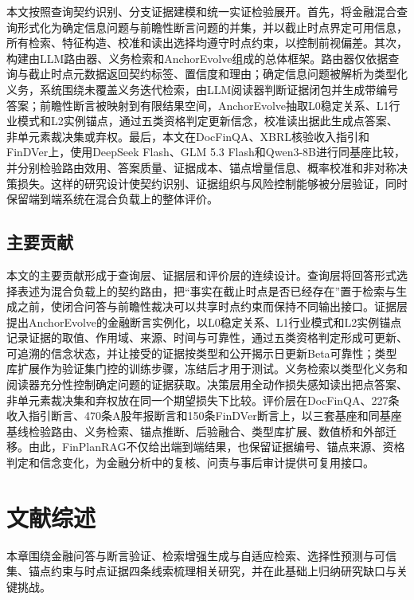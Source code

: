 本文按照查询契约识别、分支证据建模和统一实证检验展开。首先，将金融混合查询形式化为确定信息问题与前瞻性断言问题的并集，并以截止时点界定可用信息，所有检索、特征构造、校准和读出选择均遵守时点约束，以控制前视偏差\citep{lopezdeprado2018advances}。其次，构建由LLM路由器、义务检索和AnchorEvolve组成的总体框架。路由器仅依据查询与截止时点元数据返回契约标签、置信度和理由；确定信息问题被解析为类型化义务，系统围绕未覆盖义务迭代检索，由LLM阅读器判断证据闭包并生成带编号答案；前瞻性断言被映射到有限结果空间，AnchorEvolve抽取L0稳定关系、L1行业模式和L2实例锚点，通过五类资格判定更新信念，校准读出据此生成点答案、非单元素裁决集或弃权。最后，本文在DocFinQA、XBRL核验收入指引和FinDVer上，使用DeepSeek Flash、GLM 5.3 Flash和Qwen3-8B进行同基座比较，并分别检验路由效用、答案质量、证据成本、锚点增量信息、概率校准和非对称决策损失。这样的研究设计使契约识别、证据组织与风险控制能够被分层验证，同时保留端到端系统在混合负载上的整体评价。

\section{主要贡献}

本文的主要贡献形成于查询层、证据层和评价层的连续设计。查询层将回答形式选择表述为混合负载上的契约路由，把“事实在截止时点是否已经存在”置于检索与生成之前，使闭合问答与前瞻性裁决可以共享时点约束而保持不同输出接口。证据层提出AnchorEvolve的金融断言实例化，以L0稳定关系、L1行业模式和L2实例锚点记录证据的取值、作用域、来源、时间与可靠性，通过五类资格判定形成可更新、可追溯的信念状态，并让接受的证据按类型和公开揭示日更新Beta可靠性；类型库扩展作为验证集门控的训练步骤，冻结后才用于测试。义务检索以类型化义务和阅读器充分性控制确定问题的证据获取。决策层用全动作损失感知读出把点答案、非单元素裁决集和弃权放在同一个期望损失下比较。评价层在DocFinQA、227条收入指引断言、470条A股年报断言和150条FinDVer断言上，以三套基座和同基座基线检验路由、义务检索、锚点推断、后验融合、类型库扩展、数值桥和外部迁移。由此，FinPlanRAG不仅给出端到端结果，也保留证据编号、锚点来源、资格判定和信念变化，为金融分析中的复核、问责与事后审计提供可复用接口。

\chapter{文献综述}
\label{ch:related}

本章围绕金融问答与断言验证、检索增强生成与自适应检索、选择性预测与可信集、锚点约束与时点证据四条线索梳理相关研究，并在此基础上归纳研究缺口与关键挑战。

